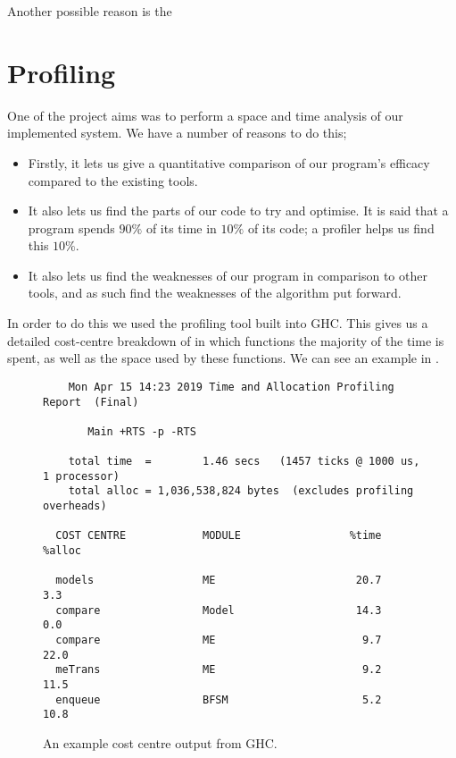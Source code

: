 \documentclass[10pt, a4paper]{report}
\begin{document}
Another possible reason is the 



\section{Profiling}

One of the project aims was to perform a space and time analysis of our
implemented system. We have a number of reasons to do this;

\begin{itemize}
\item Firstly, it lets us give a quantitative comparison of our program's
  efficacy compared to the existing tools.
\item It also lets us find the parts of our code to try and optimise. It is said
  that a program spends $90\%$ of its time in $10\%$ of its code; a profiler helps
  us find this $10\%$.
\item It also lets us find the weaknesses of our program in comparison to other
  tools, and as such find the weaknesses of the algorithm put forward. 
\end{itemize}

In order to do this we used the profiling tool built into GHC. This gives us a
detailed cost-centre breakdown of in which functions the majority of the time is
spent, as well as the space used by these functions. We can see an example in
.

\begin{figure}[h]
\begin{verbatim}
	Mon Apr 15 14:23 2019 Time and Allocation Profiling Report  (Final)

	   Main +RTS -p -RTS

	total time  =        1.46 secs   (1457 ticks @ 1000 us, 1 processor)
	total alloc = 1,036,538,824 bytes  (excludes profiling overheads)

  COST CENTRE            MODULE                 %time %alloc

  models                 ME                      20.7    3.3
  compare                Model                   14.3    0.0
  compare                ME                       9.7   22.0
  meTrans                ME                       9.2   11.5
  enqueue                BFSM                     5.2   10.8
\end{verbatim}
  \caption{An example cost centre output from GHC.}
  \label{fig:costcentre}
\end{figure}
\end{document}
